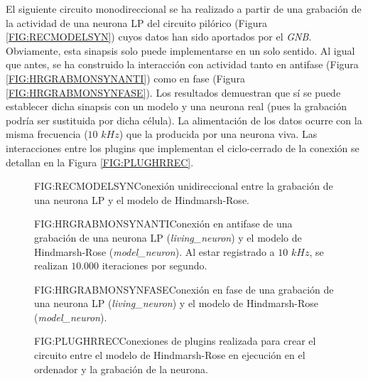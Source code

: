 
El siguiente circuito monodireccional se ha realizado a partir de una grabación de la actividad de una neurona LP del circuito pilórico (Figura \ref{FIG:RECMODELSYN}) cuyos datos han sido aportados por el \textit{GNB}. Obviamente, esta sinapsis solo puede implementarse en un solo sentido. Al igual que antes, se ha construido la interacción con actividad tanto en antifase (Figura \ref{FIG:HRGRABMONSYNANTI}) como en fase (Figura \ref{FIG:HRGRABMONSYNFASE}). Los resultados demuestran que sí se puede establecer dicha sinapsis con un modelo y una neurona real (pues la grabación podría ser sustituida por dicha célula). La alimentación de los datos ocurre con la misma frecuencia ($10$ $kHz$) que la producida por una neurona viva. Las interacciones entre los plugins que implementan el ciclo-cerrado de la conexión se detallan en la Figura \ref{FIG:PLUGHRREC}.

\begin{figure}[Esquema de conexión entre el la grabación LP y el model]{FIG:RECMODELSYN}{Conexión unidireccional entre la grabación de una neurona LP y el modelo de Hindmarsh-Rose.}
\end{figure}\textbf{}

\begin{figure}[Conexión monodirecional grabación-modelo en antifase]{FIG:HRGRABMONSYNANTI}{Conexión en antifase de una grabación de una neurona LP (\textit{living\_neuron}) y el modelo de Hindmarsh-Rose (\textit{model\_neuron}). Al estar registrado a $10$ $kHz$, se realizan $10.000$ iteraciones por segundo.}
\end{figure}


\begin{figure}[Conexión monodireccional grabación-modelo en fase]{FIG:HRGRABMONSYNFASE}{Conexión en fase de una grabación de una neurona LP (\textit{living\_neuron}) y el modelo de Hindmarsh-Rose (\textit{model\_neuron}).}
\end{figure}

\begin{figure}[Esquema de conexión de plugins para la sinapsis entre el modelo y la grabación de la neurona]{FIG:PLUGHRREC}{Conexiones de plugins realizada para crear el circuito entre el modelo de Hindmarsh-Rose en ejecución en el ordenador y la grabación de la neurona.}
\end{figure}\textbf{}
